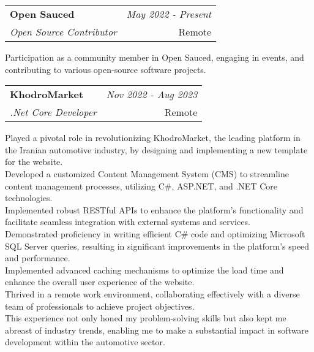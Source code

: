 \documentclass[a4paper,10pt]{article}
\makeatletter
\newcommand{\resumeSubheading}[4]{
	\vspace{0.5mm}\item
	\begin{tabular*}{0.98\textwidth}[t]{l@{\extracolsep{\fill}}r}
		\textbf{#1} & \textit{\footnotesize{#4}} \\
		\textit{\footnotesize{#3}} &  \footnotesize{#2}\\
	\end{tabular*}
	\vspace{-2.4mm}
}
\newcommand{\resumeItemListStart}{\begin{justify}\begin{itemize}[leftmargin=3ex, rightmargin=2ex, noitemsep,labelsep=1.2mm,itemsep=0mm]\small}
\newcommand{\resumeItemListEnd}{\end{itemize}\end{justify}\vspace{-2mm}}
\makeatother
\begin{document}
\vspace{-1mm}
\resumeSubheading
{Open Sauced}{Remote}
{Open Source Contributor}{May 2022 - Present}
\resumeItemListStart
Participation as a community member in Open Sauced, engaging in events, and contributing to various open-source software projects.
\resumeItemListEnd

\vspace{-1mm}
\resumeSubheading
{KhodroMarket}{Remote}
{.Net Core Developer}{Nov 2022 - Aug 2023}
\resumeItemListStart
Played a pivotal role in revolutionizing KhodroMarket, the leading platform in the Iranian automotive industry, by designing and implementing a new template for the website.\\
Developed a customized Content Management System (CMS) to streamline content management processes, utilizing C\#, ASP.NET, and .NET Core technologies.\\
Implemented robust RESTful APIs to enhance the platform's functionality and facilitate seamless integration with external systems and services.\\
Demonstrated proficiency in writing efficient C\# code and optimizing Microsoft SQL Server queries, resulting in significant improvements in the platform's speed and performance.\\
Implemented advanced caching mechanisms to optimize the load time and enhance the overall user experience of the website.\\
Thrived in a remote work environment, collaborating effectively with a diverse team of professionals to achieve project objectives.\\
This experience not only honed my problem-solving skills but also kept me abreast of industry trends, enabling me to make a substantial impact in software development within the automotive sector.
\resumeItemListEnd

\end{document}
